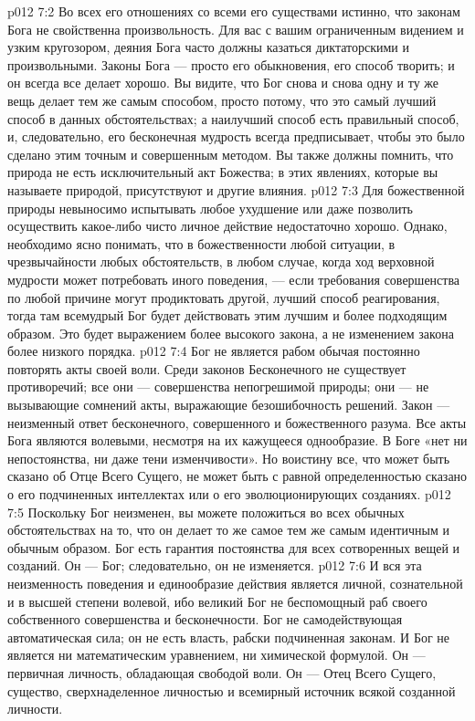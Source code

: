 \vs p012 7:2 \pc Во всех его отношениях со всеми его существами истинно, что законам Бога не свойственна произвольность. Для вас с вашим ограниченным видением и узким кругозором, деяния Бога часто должны казаться диктаторскими и произвольными. Законы Бога --- просто его обыкновения, его способ творить; и он всегда все делает хорошо. Вы видите, что Бог снова и снова одну и ту же вещь делает тем же самым способом, просто потому, что это самый лучший способ в данных обстоятельствах; а наилучший способ есть правильный способ, и, следовательно, его бесконечная мудрость всегда предписывает, чтобы это было сделано этим точным и совершенным методом. Вы также должны помнить, что природа не есть исключительный акт Божества; в этих явлениях, которые вы называете природой, присутствуют и другие влияния.
\vs p012 7:3 Для божественной природы невыносимо испытывать любое ухудшение или даже позволить осуществить какое\hyp{}либо чисто личное действие недостаточно хорошо. Однако, необходимо ясно понимать, что  в божественности любой ситуации, в чрезвычайности любых обстоятельств, в любом случае, когда ход верховной мудрости может потребовать иного поведения, --- если требования совершенства по любой причине могут продиктовать другой, лучший способ реагирования, тогда там всемудрый Бог будет действовать этим лучшим и более подходящим образом. Это будет выражением более высокого закона, а не изменением закона более низкого порядка.
\vs p012 7:4 Бог не является рабом обычая постоянно повторять акты своей воли. Среди законов Бесконечного не существует противоречий; все они --- совершенства непогрешимой природы; они --- не вызывающие сомнений акты, выражающие безошибочность решений. Закон --- неизменный ответ бесконечного, совершенного и божественного разума. Все акты Бога являются волевыми, несмотря на их кажущееся однообразие. В Боге «нет ни непостоянства, ни даже тени изменчивости». Но воистину все, что может быть сказано об Отце Всего Сущего, не может быть с равной определенностью сказано о его подчиненных интеллектах или о его эволюционирующих созданиях.
\vs p012 7:5 Поскольку Бог неизменен, вы можете положиться во всех обычных обстоятельствах на то, что он делает то же самое тем же самым идентичным и обычным образом. Бог есть гарантия постоянства для всех сотворенных вещей и созданий. Он --- Бог; следовательно, он не изменяется.
\vs p012 7:6 И вся эта неизменность поведения и единообразие действия является личной, сознательной и в высшей степени волевой, ибо великий Бог не беспомощный раб своего собственного совершенства и бесконечности. Бог не самодействующая автоматическая сила; он не есть власть, рабски подчиненная законам. И Бог не является ни математическим уравнением, ни химической формулой. Он --- первичная личность, обладающая свободой воли. Он --- Отец Всего Сущего, существо, сверхнаделенное личностью и всемирный источник всякой созданной личности.
